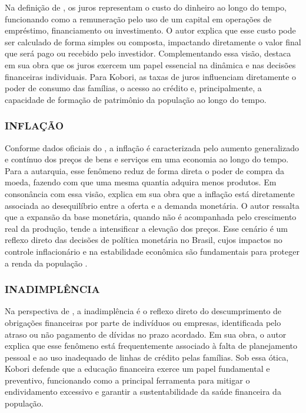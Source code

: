 \documentclass[12pt]{article}
\begin{document}
      Na definição de \cite{assef2024principios}, os juros representam o custo do dinheiro ao longo do tempo, funcionando como a remuneração pelo uso de um capital em operações de empréstimo, financiamento ou investimento. O autor explica que esse custo pode ser calculado de forma simples ou composta, impactando diretamente o valor final que será pago ou recebido pelo investidor. Complementando essa visão, \cite{kobori2024fabula} destaca em sua obra que os juros exercem um papel essencial na dinâmica e nas decisões financeiras individuais. Para Kobori, as taxas de juros influenciam diretamente o poder de consumo das famílias, o acesso ao crédito e, principalmente, a capacidade de formação de patrimônio da população ao longo do tempo.

    \subsubsection{INFLAÇÃO}

      Conforme dados oficiais do \cite{bcb:inflacao}, a inflação é caracterizada pelo aumento generalizado e contínuo dos preços de bens e serviços em uma economia ao longo do tempo. Para a autarquia, esse fenômeno reduz de forma direta o poder de compra da moeda, fazendo com que uma mesma quantia adquira menos produtos. Em consonância com essa visão, \cite{kobori2024fabula} explica em sua obra que a inflação está diretamente associada ao desequilíbrio entre a oferta e a demanda monetária. O autor ressalta que a expansão da base monetária, quando não é acompanhada pelo crescimento real da produção, tende a intensificar a elevação dos preços. Esse cenário é um reflexo direto das decisões de política monetária no Brasil, cujos impactos no controle inflacionário e na estabilidade econômica são fundamentais para proteger a renda da população \cite{flora2024dominancia}.

    \subsubsection{INADIMPLÊNCIA}

      Na perspectiva de \cite{kobori2024fabula}, a inadimplência é o reflexo direto do descumprimento de obrigações financeiras por parte de indivíduos ou empresas, identificada pelo atraso ou não pagamento de dívidas no prazo acordado. Em sua obra, o autor explica que esse fenômeno está frequentemente associado à falta de planejamento pessoal e ao uso inadequado de linhas de crédito pelas famílias. Sob essa ótica, Kobori defende que a educação financeira exerce um papel fundamental e preventivo, funcionando como a principal ferramenta para mitigar o endividamento excessivo e garantir a sustentabilidade da saúde financeira da população.
\end{document}
